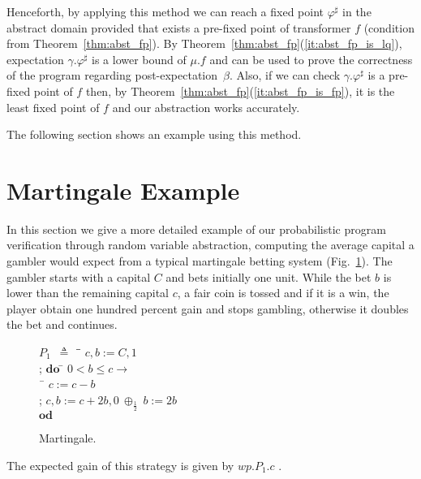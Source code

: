 \documentclass{eptcs}
\theoremstyle{plain}
\theoremstyle{definition}
\newcommand{\lit}[1]{\ensuremath{\mathit{#1}}}
\newcommand{\Prg}{P}
\newcommand{\Def}{\ensuremath{\triangleq}}
\newcommand{\ra}{\ensuremath{\rightarrow}}
\newcommand{\Wp}{\lit{wp}}
\newcommand{\DO}[0]{\textbf{do}}
\newcommand{\OD}[0]{\textbf{od}}
\newcommand{\noi}[0]{\noindent}
\begin{document}
\noi Henceforth, by applying this method we can reach a fixed point
$\varphi^\sharp$ in the abstract domain provided that exists a pre-fixed point
of transformer $f$ (condition from Theorem~\ref{thm:abst_fp}). By
Theorem~\ref{thm:abst_fp}(\ref{it:abst_fp_is_lq}), expectation
$\gamma.\varphi^\sharp$ is a lower bound of $\mu.f$ and can be used to prove the
correctness of the program regarding \mbox{post-expectation}~$\beta$. Also, if we can
check $\gamma.\varphi^\sharp$ is a pre-fixed point of $f$ then, by
Theorem~\ref{thm:abst_fp}(\ref{it:abst_fp_is_fp}), it is the least fixed point of
$f$ and our abstraction works accurately.

The following section shows an example using this method.

\section{Martingale Example}\label{case_study}

In this section we give a more detailed example of our probabilistic program verification through random variable abstraction, computing the average capital a gambler would expect from a typical martingale betting system (Fig.~\ref{fig:martingale}).
The gambler starts with a capital $C$ and bets initially one unit.
While the bet $b$ is lower than the remaining capital $c$, a fair coin is tossed and if it is a win, the player obtain one hundred percent gain and stops gambling, otherwise it doubles the bet and continues.
\begin{figure}[!ht]
\begin{center}
\begin{minipage}{\textwidth}
\begin{tabbing}
	$\Prg_1$\ $\Def$ \= \ \= $c,b:=C,1$ \\
	\>; \> $\DO$ \= $0<b\leq c \ra$ \\
	\>\>	\> \ \= $c:=c-b$ \\
	\>\>	\> ; \> $c,b:=c+2b,0\ \oplus_{\frac{1}{2}}\ b:=2b$ \\
	\>\> $\OD$
\end{tabbing}
\end{minipage}
\end{center}
\caption{Martingale.}
\label{fig:martingale}
\end{figure}
The expected gain of this strategy is given by $\Wp.\Prg_1.c$ .
\end{document}
